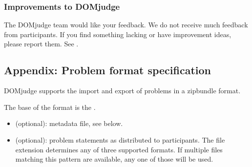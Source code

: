 \documentclass[a4paper,10pt,english,openany]{sphinxmanual}
\begin{document}
\def\sphinxLiteralBlockLabel{\label{\detokenize{team:id12}}}
\begin{sphinxVerbatim}[commandchars=\\\{\}]

\end{sphinxVerbatim}


\subsubsection{Improvements to DOMjudge}
\label{\detokenize{team:improvements-to-domjudge}}
\sphinxAtStartPar
The DOMjudge team would like your feedback. We do not receive much feedback from participants.
If you find something lacking or have improvement ideas, please report them. See .

\sphinxstepscope


\subsection{Appendix: Problem format specification}
\label{\detokenize{problem-format:appendix-problem-format-specification}}\label{\detokenize{problem-format::doc}}
\sphinxAtStartPar
DOMjudge supports the import and export of problems in a zip\sphinxhyphen{}bundle
format.

\sphinxAtStartPar
The base of the format is the .
\begin{description}
\begin{itemize}
\item {} 
\sphinxAtStartPar
{} (optional): metadata file, see below.

\item {} 
\sphinxAtStartPar
{} (optional): problem statements as
distributed to participants. The file extension determines any of
three supported formats. If multiple files matching this pattern are
available, any one of those will be used.

\end{itemize}

\end{description}
\end{document}
